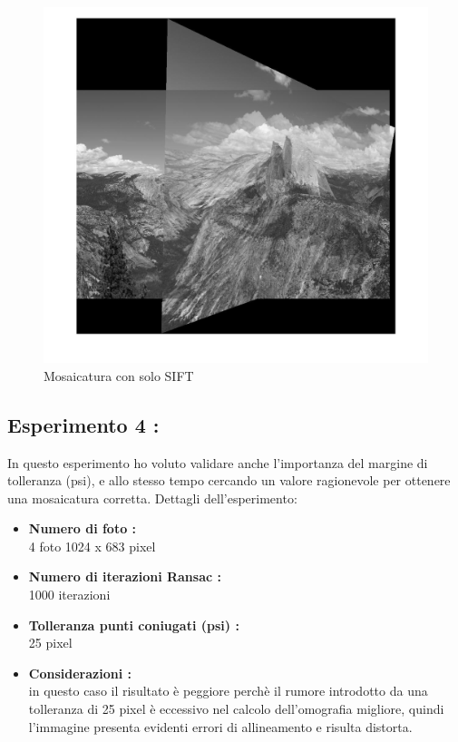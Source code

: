 \documentclass[11pt, oneside]{article}   	%
\begin{document}
\begin{figure}[H]
\includegraphics[width=\textwidth]{only_sift.jpg}
\caption{Mosaicatura con solo SIFT}
\end{figure}




\subsection{Esperimento 4 :}
In questo esperimento ho voluto validare anche l'importanza del margine di tolleranza (psi), e allo stesso tempo cercando un valore ragionevole per ottenere una mosaicatura corretta.
Dettagli dell'esperimento:
\begin{itemize}
	\item \textbf{Numero di foto :} \\
	4 foto 1024 x 683 pixel
	\item \textbf{Numero di iterazioni Ransac : } \\
	1000 iterazioni
	\item \textbf{Tolleranza punti coniugati (psi) :}\\
        25 pixel
        \item \textbf{Considerazioni : }\\
        in questo caso il risultato è peggiore perchè il rumore introdotto da una tolleranza di 25 pixel è eccessivo nel calcolo dell'omografia migliore, quindi l'immagine presenta evidenti errori di allineamento e risulta distorta.
\end{itemize}
\end{document}
